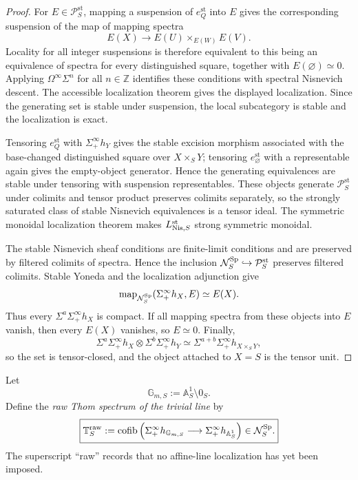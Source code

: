 \begin{proof}
For $E\in\mathcal P_S^{\mathrm{st}}$, mapping a suspension of
$e_Q^{\mathrm{st}}$ into $E$ gives the corresponding suspension of the map of
mapping spectra
\[
    E(X)
    \longrightarrow
    E(U)\times_{E(W)}E(V).
\]
Locality for all integer suspensions is therefore equivalent to this being an
equivalence of spectra for every distinguished square, together with
$E(\varnothing)\simeq0$.  Applying $\Omega^\infty\Sigma^n$ for all
$n\in\mathbb Z$ identifies these conditions with spectral Nisnevich descent.
The accessible localization theorem gives the displayed localization.  Since
the generating set is stable under suspension, the local subcategory is
stable and the localization is exact.

Tensoring $e_Q^{\mathrm{st}}$ with $\Sigma^\infty_+h_Y$ gives the stable
excision morphism associated with the base-changed distinguished square over
$X\times_SY$; tensoring $e_\varnothing^{\mathrm{st}}$ with a representable
again gives the empty-object generator.  Hence the generating equivalences
are stable under tensoring with suspension representables.  These objects
generate $\mathcal P_S^{\mathrm{st}}$ under colimits and tensor product
preserves colimits separately, so the strongly saturated class of stable
Nisnevich equivalences is a tensor ideal.  The symmetric monoidal
localization theorem makes $L^{\mathrm{st}}_{\mathrm{Nis},S}$ strong symmetric
monoidal.

The stable Nisnevich sheaf conditions are finite-limit conditions and are
preserved by filtered colimits of spectra.  Hence the inclusion
$\mathcal N_S^{\mathrm{Sp}}\hookrightarrow\mathcal P_S^{\mathrm{st}}$ preserves filtered
colimits.  Stable Yoneda and the localization adjunction give
\[
    \operatorname{map}_{\mathcal N_S^{\mathrm{Sp}}}
    (\Sigma^\infty_+h_X,E)
    \simeq
    E(X).
\]
Thus every $\Sigma^a\Sigma^\infty_+h_X$ is compact.  If all mapping spectra
from these objects into $E$ vanish, then every $E(X)$ vanishes, so
$E\simeq0$.  Finally,
\[
    \Sigma^a\Sigma^\infty_+h_X
    \otimes
    \Sigma^b\Sigma^\infty_+h_Y
    \simeq
    \Sigma^{a+b}\Sigma^\infty_+h_{X\times_SY},
\]
so the set is tensor-closed, and the object attached to $X=S$ is the tensor
unit.
\end{proof}

\begin{definition}
\label{def:infinitesimal-raw-thom}
Let
\[
    \mathbb G_{m,S}
    :=
    \mathbb A^1_S\setminus0_S.
\]
Define the \emph{raw Thom spectrum of the trivial line} by
\[
    \boxed{
    \mathbb T_S^{\mathrm{raw}}
    :=
    \operatorname{cofib}\left(
        \Sigma^\infty_+h_{\mathbb G_{m,S}}
        \longrightarrow
        \Sigma^\infty_+h_{\mathbb A^1_S}
    \right)
    \in\mathcal N_S^{\mathrm{Sp}}.
    }
\]
The superscript ``raw'' records that no affine-line localization has yet been
imposed.
\end{definition}

